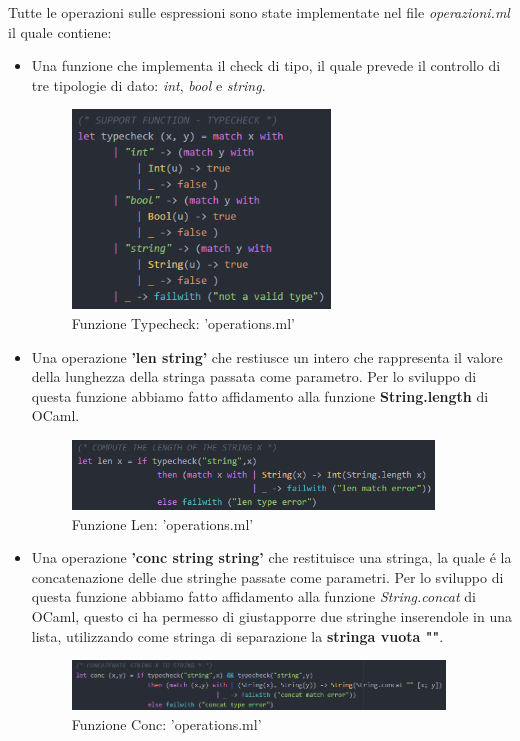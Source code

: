 \documentclass[a4paper,titlepage]{book}
\begin{document}
Tutte le operazioni sulle espressioni sono state implementate nel file \textit{operazioni.ml} il quale contiene:
\begin{itemize}
\item Una funzione che implementa il check di tipo, il quale prevede il controllo di tre tipologie di dato: \textit{int}, \textit{bool} e
\textit{string}.

\begin{figure}[H]
\center
\includegraphics[height=200px]{img/typecheck.png}
\caption{Funzione Typecheck: 'operations.ml' \label{fig:typecheck}}
\end{figure}

\item Una operazione \textbf{'len string'} che restiusce un intero che rappresenta il valore della lunghezza della stringa passata come parametro.
Per lo sviluppo di questa funzione abbiamo fatto affidamento alla funzione \textbf{String.length} di OCaml.

\begin{figure}[H]
\center
\includegraphics[height=70px]{img/len.png}
\caption{Funzione Len: 'operations.ml' \label{fig:len}}
\end{figure}
\clearpage

\item Una operazione \textbf{'conc string string'} che restituisce una stringa, la quale \'e la concatenazione delle due stringhe passate come parametri.
Per lo sviluppo di questa funzione abbiamo fatto affidamento alla funzione \textit{String.concat} di OCaml, questo ci ha permesso di giustapporre due stringhe inserendole in una lista, utilizzando come stringa di separazione la \textbf{stringa vuota ""}.

\begin{figure}[H]
\center
\includegraphics[height=50px]{img/conc.png}
\caption{Funzione Conc: 'operations.ml' \label{fig:conc}}
\end{figure}


\end{itemize}
\end{document}
